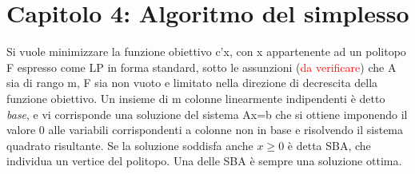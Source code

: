 \documentclass[answers, a4paper, 11pt]{exam}
\begin{document}
\section{Capitolo 4: Algoritmo del simplesso}
Si vuole minimizzare la funzione obiettivo c'x, con x appartenente ad un politopo F espresso come LP in forma standard, sotto le assunzioni (\textcolor{red}{da verificare}) che A sia di rango m, F sia non vuoto e limitato nella direzione di decrescita della funzione obiettivo. Un insieme di m colonne linearmente indipendenti è detto \emph{base}, e vi corrisponde una soluzione del sistema Ax=b che si ottiene imponendo il valore 0 alle variabili corrispondenti a colonne non in base e risolvendo il sistema quadrato risultante. Se la soluzione soddisfa anche $x \ge 0$ è detta SBA, che individua un vertice del politopo. Una delle SBA è sempre una soluzione ottima.
\end{document}
